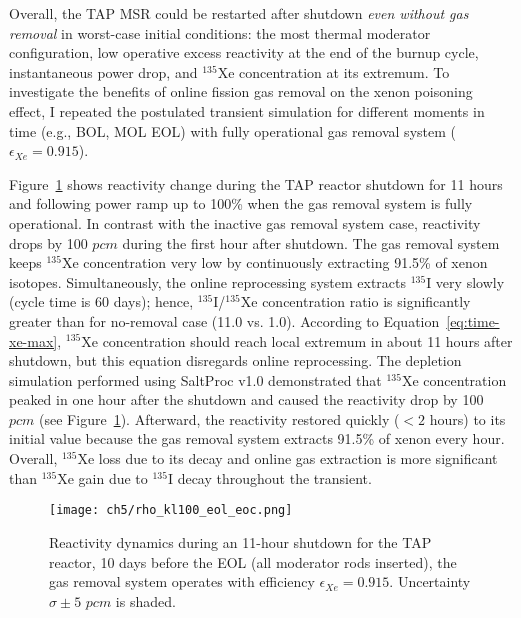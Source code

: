 Overall, the \gls{TAP} \gls{MSR} could be restarted after shutdown \emph{even 
without gas removal} in worst-case initial conditions: the most thermal 
moderator configuration, low operative excess reactivity at the end of the 
burnup cycle, instantaneous power drop, and $^{135}$Xe concentration at its 
extremum. To investigate the benefits of online fission gas removal on the 
xenon poisoning effect, I repeated the postulated transient simulation for 
different moments in time (e.g., \gls{BOL}, MOL \gls{EOL}) with fully 
operational gas removal system ($\epsilon_{Xe}=0.915$). 

Figure~\ref{fig:lf-tap-rho-kl100-eol-eoc} shows reactivity change during the
\gls{TAP} reactor shutdown for 11 hours and following power ramp up to 100\% 
when the gas removal system is fully operational. 
In contrast with the inactive gas removal system case, reactivity drops 
by 100 $pcm$ during the first hour after shutdown. The gas removal 
system keeps $^{135}$Xe concentration very low by continuously extracting 
91.5\% of xenon isotopes. Simultaneously, the online reprocessing system 
extracts $^{135}$I very slowly (cycle time is 60 days); hence, 
$^{135}$I/$^{135}$Xe concentration ratio is significantly greater than for 
no-removal case (11.0 vs. 1.0). According to Equation~\ref{eq:time-xe-max},
$^{135}$Xe concentration should reach local extremum in about 11 hours after 
shutdown, but this equation disregards online reprocessing. The 
depletion simulation performed using SaltProc v1.0 demonstrated that $^{135}$Xe
concentration peaked in one hour after the shutdown and caused the reactivity 
drop by 100 $pcm$ (see Figure~\ref{fig:lf-tap-rho-kl100-eol-eoc}). Afterward, 
the reactivity restored quickly ($<2$ hours) to its initial value because 
the gas removal system extracts 91.5\% of xenon every hour. Overall, 
$^{135}$Xe loss due to its decay and online gas extraction is more significant 
than $^{135}$Xe gain due to $^{135}$I decay throughout the transient.
\begin{figure}[htp!] %
	\centering
	\texttt{[image: ch5/rho\_kl100\_eol\_eoc.png]}
	\vspace{-5mm}
	\caption{Reactivity dynamics during an 11-hour shutdown for the 
		\gls{TAP} reactor, 10 days before the \gls{EOL} (all moderator rods 
		inserted), the gas removal system operates with efficiency 
		$\epsilon_{Xe}=0.915$. Uncertainty $\sigma\pm5$ $pcm$ is 
		shaded.}
	\label{fig:lf-tap-rho-kl100-eol-eoc}
\end{figure}

